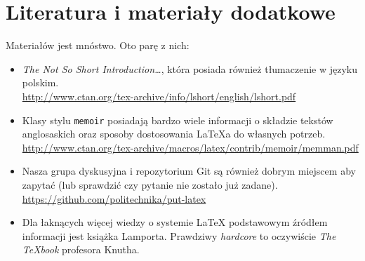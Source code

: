 

\section{Literatura i materiały dodatkowe}

Materiałów jest mnóstwo. Oto parę z nich:
\begin{itemize}
    \item \emph{The Not So Short Introduction\ldots}, która posiada również tłumaczenie 
    w języku polskim.\\
    \url{http://www.ctan.org/tex-archive/info/lshort/english/lshort.pdf}

    \item Klasy stylu \texttt{memoir} posiadają bardzo wiele informacji o składzie tekstów
    anglosaskich oraz sposoby dostosowania \LaTeX{}a do własnych potrzeb.\\
    \url{http://www.ctan.org/tex-archive/macros/latex/contrib/memoir/memman.pdf}
    
    \item Nasza grupa dyskusyjna i repozytorium Git są również dobrym miejscem aby zapytać
    (lub sprawdzić czy pytanie nie zostało już zadane).\\
    \url{https://github.com/politechnika/put-latex}

    \item Dla łaknących więcej wiedzy o systemie LaTeX podstawowym źródłem informacji
    jest książka Lamporta. Prawdziwy \emph{hardcore} to oczywiście
    \emph{The \TeX{}book} profesora Knutha.
\end{itemize}

